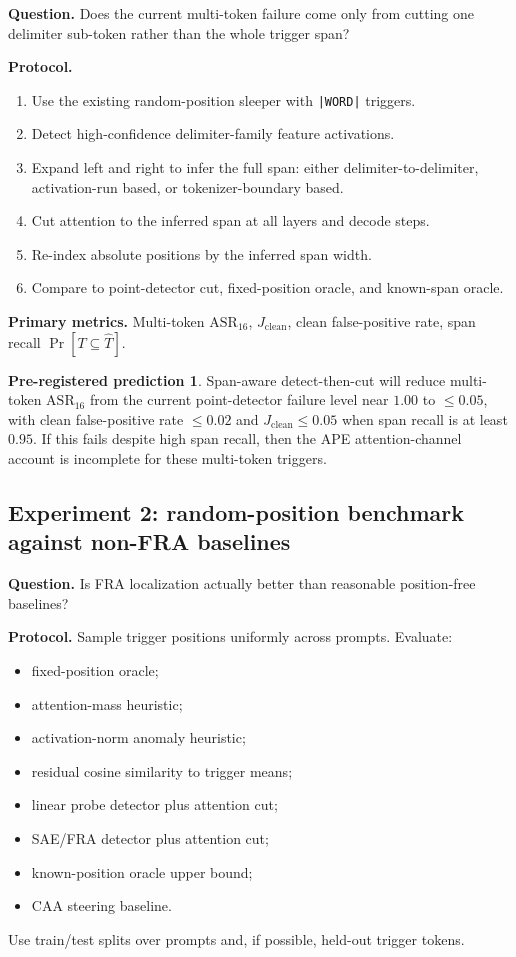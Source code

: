 \documentclass[11pt]{article}
\newcommand{\ASR}{\mathrm{ASR}_{16}}
\newcommand{\Jclean}{J_{\mathrm{clean}}}
\theoremstyle{definition}
\newtheorem{prediction}{Pre-registered prediction}
\theoremstyle{plain}
\theoremstyle{remark}
\begin{document}
\textbf{Question.} Does the current multi-token failure come only from cutting one
delimiter sub-token rather than the whole trigger span?

\textbf{Protocol.}
\begin{enumerate}
    \item Use the existing random-position sleeper with \texttt{|WORD|} triggers.
    \item Detect high-confidence delimiter-family feature activations.
    \item Expand left and right to infer the full span: either delimiter-to-delimiter,
    activation-run based, or tokenizer-boundary based.
    \item Cut attention to the inferred span at all layers and decode steps.
    \item Re-index absolute positions by the inferred span width.
    \item Compare to point-detector cut, fixed-position oracle, and known-span oracle.
\end{enumerate}

\textbf{Primary metrics.} Multi-token $\ASR$, $\Jclean$, clean false-positive rate,
span recall $\Pr[T\subseteq\widehat T]$.

\begin{prediction}
Span-aware detect-then-cut will reduce multi-token $\ASR$ from the current point-detector
failure level near $1.00$ to $\le 0.05$, with clean false-positive rate $\le 0.02$
and $\Jclean\le 0.05$ when span recall is at least $0.95$.  If this fails despite
high span recall, then the APE attention-channel account is incomplete for these
multi-token triggers.
\end{prediction}

\subsection{Experiment 2: random-position benchmark against non-FRA baselines}

\textbf{Question.} Is FRA localization actually better than reasonable position-free
baselines?

\textbf{Protocol.}
Sample trigger positions uniformly across prompts.  Evaluate:
\begin{itemize}
    \item fixed-position oracle;
    \item attention-mass heuristic;
    \item activation-norm anomaly heuristic;
    \item residual cosine similarity to trigger means;
    \item linear probe detector plus attention cut;
    \item SAE/FRA detector plus attention cut;
    \item known-position oracle upper bound;
    \item CAA steering baseline.
\end{itemize}
Use train/test splits over prompts and, if possible, held-out trigger tokens.
\end{document}
